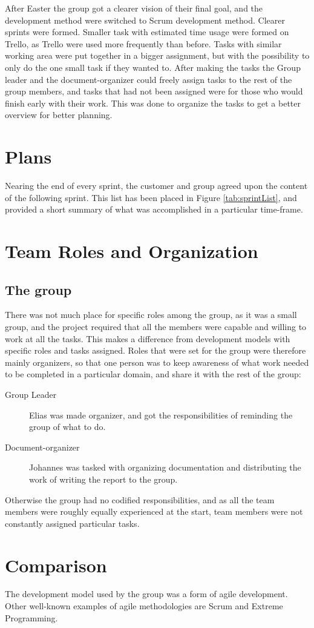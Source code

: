 After Easter the group got a clearer vision of their final goal, and the development method were switched to Scrum development method. Clearer sprints were formed. Smaller task with estimated time usage were formed on Trello, as Trello were used more frequently than before. Tasks with similar working area were put together in a bigger assignment, but with the possibility to only do the one small task if they wanted to. After making the tasks the Group leader and the document-organizer could freely assign tasks to the rest of the group members, and tasks that had not been assigned were for those who would finish early with their work. This was done to organize the tasks to get a better overview for better planning.


\section{Plans}

Nearing the end of every sprint, the customer and group agreed upon the content of the following sprint. This list has been placed in Figure \ref{tab:sprintList}, and provided a short summary of what was accomplished in a particular time-frame. 


\section{Team Roles and Organization}
\subsection{The group}
There was not much place for specific roles among the group, as it was a small group, and the project required that all the members were capable and willing to work at all the tasks. This makes a difference from development models with specific roles and tasks assigned. Roles that were set for the group were therefore mainly organizers, so that one person was to keep awareness of what work needed to be completed in a particular domain, and share it with the rest of the group:

\begin{description}

\item[Group Leader] Elias was made organizer, and got the responsibilities of reminding the group of what to do.
\item[Document-organizer] Johannes was tasked with organizing documentation and distributing the work of writing the report to the group. 
\end{description}
 
 Otherwise the group had no codified responsibilities, and as all the team members were roughly equally experienced at the start, team members were not constantly assigned particular tasks.

\section{Comparison}
The development model used by the group was a form of agile development. Other well-known examples of agile methodologies are Scrum and Extreme Programming.
 

